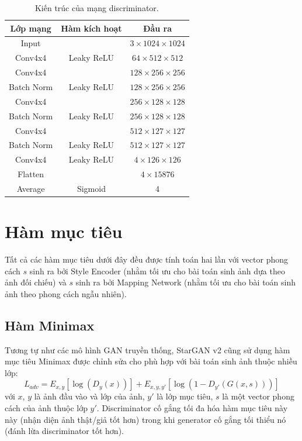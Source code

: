 \documentclass[12pt]{extreport}
\begin{document}
\begin{table}[H]
    \centering
    \begin{tabular}{c c c}
        Lớp mạng   & Hàm kích hoạt & Đầu ra                        \\
        \hline
        Input      &               & $ 3 \times 1024 \times 1024 $ \\
        \hline
        Conv4x4    & Leaky ReLU    & $ 64 \times 512 \times 512 $  \\
        Conv4x4    &               & $ 128 \times 256 \times 256 $ \\
        Batch Norm & Leaky ReLU    & $ 128 \times 256 \times 256 $ \\
        Conv4x4    &               & $ 256 \times 128 \times 128 $ \\
        Batch Norm & Leaky ReLU    & $ 256 \times 128 \times 128 $ \\
        Conv4x4    &               & $ 512 \times 127 \times 127 $ \\
        Batch Norm & Leaky ReLU    & $ 512 \times 127 \times 127 $ \\
        Conv4x4    & Leaky ReLU    & $ 4 \times 126 \times 126 $   \\
        Flatten    &               & $ 4 \times 15876 $            \\
        Average    & Sigmoid       & 4
    \end{tabular}
    \caption{Kiến trúc của mạng discriminator.}
\end{table}

\section{Hàm mục tiêu}

Tất cả các hàm mục tiêu dưới đây đều được tính toán hai lần với vector phong cách $ s $ sinh ra bởi Style Encoder (nhằm tối ưu cho bài toán sinh ảnh dựa theo ảnh đối chiếu) và $ s $ sinh ra bởi Mapping Network (nhằm tối ưu cho bài toán sinh ảnh theo phong cách ngẫu nhiên).

\subsection{Hàm Minimax}

Tương tự như các mô hình GAN truyền thống, StarGAN v2 cũng sử dụng hàm mục tiêu Minimax được chỉnh sửa cho phù hợp với bài toán sinh ảnh thuộc nhiều lớp:
$$ L_{adv} =  E_{x,y} [\log(D_y(x))] + E_{x,y,y'} [\log(1 - D_{y'}(G(x,s)))] $$
với $ x $, $ y $ là ảnh đầu vào và lớp của ảnh, $ y' $ là lớp mục tiêu, $ s $ là một vector phong cách của ảnh thuộc lớp $ y' $. Discriminator cố gắng tối đa hóa hàm mục tiêu này này (nhận diện ảnh thật/giả tốt hơn) trong khi generator cố gắng tối thiểu nó (đánh lừa discriminator tốt hơn).
\end{document}

